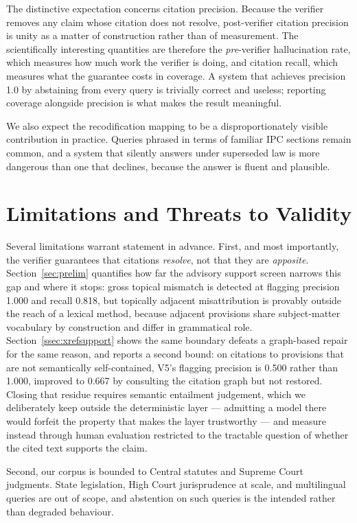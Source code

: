 \documentclass[conference]{IEEEtran}
\begin{document}
The distinctive expectation concerns citation precision. Because the verifier removes any claim whose citation does not resolve, post-verifier citation precision is unity as a matter of construction rather than of measurement. The scientifically interesting quantities are therefore the \emph{pre}-verifier hallucination rate, which measures how much work the verifier is doing, and citation recall, which measures what the guarantee costs in coverage. A system that achieves precision 1.0 by abstaining from every query is trivially correct and useless; reporting coverage alongside precision is what makes the result meaningful.

We also expect the recodification mapping to be a disproportionately visible contribution in practice. Queries phrased in terms of familiar IPC sections remain common, and a system that silently answers under superseded law is more dangerous than one that declines, because the answer is fluent and plausible.

\section{Limitations and Threats to Validity}
\label{sec:limitations}

Several limitations warrant statement in advance. First, and most importantly, the verifier guarantees that citations \emph{resolve}, not that they are \emph{apposite}. Section~\ref{sec:prelim} quantifies how far the advisory support screen narrows this gap and where it stops: gross topical mismatch is detected at flagging precision 1.000 and recall 0.818, but topically adjacent misattribution is provably outside the reach of a lexical method, because adjacent provisions share subject-matter vocabulary by construction and differ in grammatical role. Section~\ref{ssec:xrefsupport} shows the same boundary defeats a graph-based repair for the same reason, and reports a second bound: on citations to provisions that are not semantically self-contained, V5's flagging precision is 0.500 rather than 1.000, improved to 0.667 by consulting the citation graph but not restored. Closing that residue requires semantic entailment judgement, which we deliberately keep outside the deterministic layer --- admitting a model there would forfeit the property that makes the layer trustworthy --- and measure instead through human evaluation restricted to the tractable question of whether the cited text supports the claim.

Second, our corpus is bounded to Central statutes and Supreme Court judgments. State legislation, High Court jurisprudence at scale, and multilingual queries are out of scope, and abstention on such queries is the intended rather than degraded behaviour.
\end{document}
